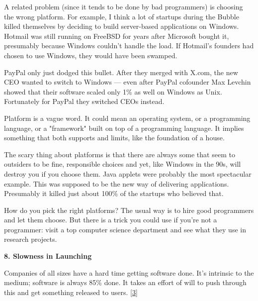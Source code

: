 A related problem (since it tends to be done by
                    bad programmers) is choosing the wrong platform. For
                    example, I think a lot of startups during the Bubble killed
                    themselves by deciding to build server-based applications on
                    Windows. Hotmail was still running on FreeBSD for years
                    after Microsoft bought it, presumably because Windows
                    couldn't handle the load. If Hotmail's founders had chosen
                    to use Windows, they would have been swamped.

PayPal
                    only just dodged this bullet. After they merged with X.com,
                    the new CEO wanted to switch to Windows --- even after
                    PayPal cofounder Max Levchin showed that their software
                    scaled only 1\% as well on Windows as Unix. Fortunately for
                    PayPal they switched CEOs instead.

Platform is a
                    vague word. It could mean an operating system, or a
                    programming language, or a "framework" built on top of a
                    programming language. It implies something that both
                    supports and limits, like the foundation of a house.

The
                    scary thing about platforms is that there are always some
                    that seem to outsiders to be fine, responsible choices and
                    yet, like Windows in the 90s, will destroy you if you choose
                    them. Java applets were probably the most spectacular
                    example. This was supposed to be the new way of delivering
                    applications. Presumably it killed just about 100\% of the
                    startups who believed that.

How do you pick the
                    right platforms? The usual way is to hire good programmers
                    and let them choose. But there is a trick you could use if
                    you're not a programmer: visit a top computer science
                    department and see what they use in research projects.

\textbf{8. Slowness in Launching}

Companies of all sizes have a hard time getting
                    software done. It's intrinsic to the medium; software is
                    always 85\% done. It takes an effort of will to push through
                    this and get something released to users.
                    [\href{\#f3n}{3}]

